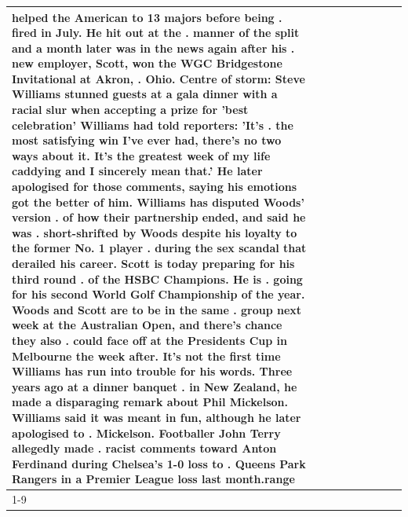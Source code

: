 \begin{table}[H]
\begin{tabular}{lllrlllll}
helped the American to 13 majors before being . fired in July. He hit out at the . manner of the split and a month later was in the news again after his . new employer, Scott, won the WGC Bridgestone Invitational at Akron, . Ohio. Centre of storm: Steve Williams stunned guests at a gala dinner with a racial slur when accepting a prize for 'best celebration' Williams had told reporters: 'It's . the most satisfying win I've ever had, there's no two ways about it. It's the greatest week of my life caddying and I sincerely mean that.' He later apologised for those comments, saying his emotions got the better of him. Williams has disputed Woods' version . of how their partnership ended, and said he was . short-shrifted by Woods despite his loyalty to the former No. 1 player . during the sex scandal that derailed his career. Scott is today preparing for his third round . of the HSBC Champions. He is . going for his second World Golf Championship of the year. Woods and Scott are to be in the same . group next week at the Australian Open, and there's chance they also . could face off at the Presidents Cup in Melbourne the week after. It's not the first time Williams has run into trouble for his words. Three years ago at a dinner banquet . in New Zealand, he made a disparaging remark about Phil Mickelson. Williams said it was meant in fun, although he later apologised to . Mickelson. Footballer John Terry allegedly made . racist comments toward Anton Ferdinand during Chelsea's 1-0 loss to . Queens Park Rangers in a Premier League loss last month.range \\
\cline{1-9}

\end{tabular}
\end{table}
